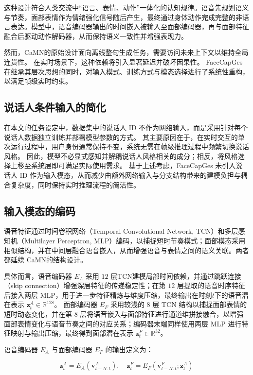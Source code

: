 这种设计符合人类交流中“语言、表情、动作”一体化的认知规律\cite{mcneill_1992_hand, kendon_2004_gesture}。语音先规划语义与节奏，面部表情作为情绪强化信号随后产生，最终通过身体动作完成完整的非语言表达。模型中，语音编码器输出的时间嵌入被输入至面部编码器，再与面部特征融合后驱动动作解码器，从而保持语义一致性并增强表现力。

然而，CaMN的原始设计面向离线整句生成任务，需要访问未来上下文以维持全局连贯性。
在实时场景下，这种依赖将引入显著延迟并破坏因果性。
FaceCapGes在继承其层次思想的同时，对输入模式、训练方式与模态选择进行了系统性重构，以满足帧级实时约束。

\subsection{说话人条件输入的简化}

在本文的任务设定中，数据集中的说话人 ID 不作为网络输入，而是采用针对每个说话人数据独立训练并部署模型参数的方式。
其主要原因在于，在实时交互的单次运行过程中，用户身份通常保持不变，系统无需在帧级推理过程中频繁切换说话风格。
因此，模型不必显式感知并解耦说话人风格相关的成分；相反，将风格选择上移至系统层即可满足实际使用需求。
基于上述考虑，FaceCapGes 未引入说话人 ID 作为输入模态，从而减少由额外网络输入与分支结构带来的建模负担与耦合复杂度，同时保持实时推理流程的简洁性。

\subsection{输入模态的编码}
语音特征通过时间卷积网络（Temporal Convolutional Network, TCN）和多层感知机（Multilayer Perceptron, MLP）编码，以捕捉短时节奏模式；面部模态采用相似结构，并在中间层融合语音嵌入，从而增强语音与表情之间的语义关联。两者都延续 CaMN\cite{beatcamn}的结构设计。

具体而言，语音编码器 $E_A$ 采用 $12$ 层TCN建模局部时间依赖，并通过跳跃连接（skip connection）增强深层特征的传递稳定性；在第 $12$ 层提取的语音时序特征后接入两层 MLP，用于进一步特征精炼与维度压缩，最终输出在时刻$t$下的语音潜在表示 $\bm{z}^{A}_t \in \mathbb{R}^{128}$。
面部编码器 $E_F$ 采用较浅的 $8$ 层 TCN 结构以捕捉面部表情的短时动态变化，并在第 $8$ 层将语音嵌入与面部特征进行通道维拼接融合，以增强面部表情变化与语音节奏之间的对应关系；编码器末端同样使用两层 MLP 进行特征映射与输出压缩，最终得到面部潜在表示 $\bm{z}^{F}_t \in \mathbb{R}^{32}$。

语音编码器 $E_A$ 与面部编码器 $E_F$ 的输出定义为：

\begin{equation}
\bm{z}^{A}_t = E_A(\bm{v}_{t-N:t}^{A}), \quad
\bm{z}^{F}_t = E_F(\bm{v}_{t-N:t}^{F}; \bm{z}^{A}_t)
\end{equation}

